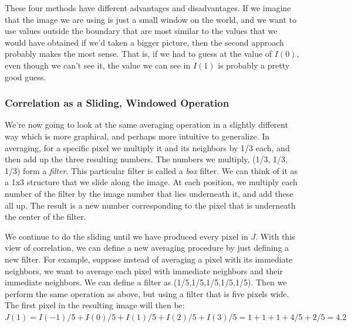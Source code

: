 \documentclass{report}
\begin{document}
These four methods have different advantages and disadvantages. If we imagine that the image we are using is just a small window on the world, and we want to use values outside the boundary that are most similar to the values that we would have obtained if we'd taken a bigger picture, then the second approach probably makes the most sense. That is, if we had to guess at the value of $I(0)$, even though we can't see it, the value we can see in $I(1)$ is probably a pretty good guess.

\subsubsection{Correlation as a Sliding, Windowed Operation}
We're now going to look at the same averaging operation in a slightly different way which is more graphical, and perhaps more intuitive to generalize. In averaging, for a specific pixel we multiply it and its neighbors by 1/3 each, and then add up the three resulting numbers. The numbers we multiply, (1/3, 1/3, 1/3) form a \textit{filter}. This particular filter is called a \textit{box} filter. We can think of it as a 1x3 structure that we slide along the image. At each position, we multiply each number of the filter by the image number that lies underneath it, and add these all up. The result is a new number corresponding to the pixel that is underneath the center of the filter.\newline

We continue to do the sliding until we have produced every pixel in $J$. With this view of correlation, we can define a new averaging procedure by just defining a new filter. For example, suppose instead of averaging a pixel with its immediate neighbors, we want to average each pixel with immediate neighbors and their immediate neighbors. We can define a filter as (1/5,1/5,1/5,1/5,1/5). Then we perform the same operation as above, but using a filter that is five pixels wide. The first pixel in the resulting image will then be: $J(1)=I(-1)/5+I(0)/5+I(1)/5+I(2)/5+I(3)/5=1+1+1+4/5+2/5=4.2$
\end{document}
